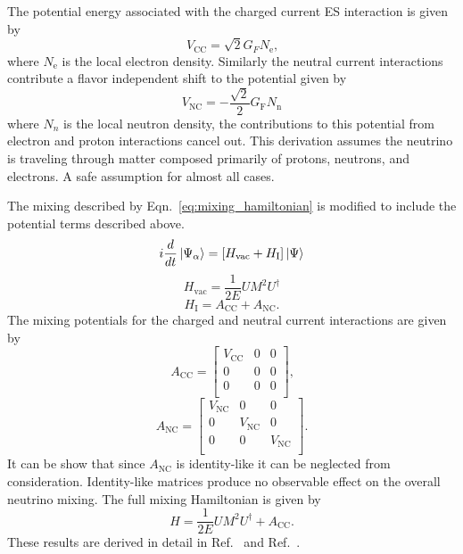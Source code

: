The potential energy associated with the charged current ES interaction
is given by
\begin{equation}
V_{\mathrm{CC}} = \sqrt{2}G_{F}N_{\text{e}}\text{,}
\end{equation}
where $N_{\mathrm{e}}$ is the local electron density.
Similarly the neutral current interactions contribute a flavor independent
shift to the potential given by
\begin{equation}
V_{\mathrm{NC}} = -\frac{\sqrt{2}}{2} G_{\text{F}} N_{\mathrm{n}}
\end{equation}
where $N_{n}$ is the local neutron density, the contributions to this potential
from electron and proton interactions cancel out.
This derivation assumes the neutrino is traveling through matter composed primarily
of protons, neutrons, and electrons.
 A safe assumption for almost all cases.

The mixing described by Eqn.~\eqref{eq:mixing_hamiltonian} is modified to include
the potential terms described above.
\begin{equation}
i\frac{d}{dt}\ket{\Psi_{\alpha}} = \left[H_{\mathrm{vac}} + H_{\mathrm{I}}\right]\ket{\Psi}
\end{equation}
\begin{equation}
H_{\mathrm{vac}}  = \frac{1}{2E}UM^{2}U^{\dagger}
\end{equation}
\begin{equation}
 H_{\mathrm{I}} =  A_{\mathrm{CC}} + A_{\mathrm{NC}}\text{.}
\end{equation}
The mixing potentials for the charged and neutral current interactions
are given by
\begin{equation}
A_{\mathrm{CC}} = 
\begin{bmatrix}
    V_{\mathrm{CC}} & 0 & 0  \\
    0 & 0 & 0  \\
    0 & 0 & 0\\
\end{bmatrix}\text{,}
\end{equation}
\begin{equation}
A_{\mathrm{NC}} = 
\begin{bmatrix}
    V_{\mathrm{NC}} & 0 & 0  \\
    0 & V_{\mathrm{NC}} & 0  \\
    0 & 0 & V_{\mathrm{NC}}\\
\end{bmatrix}\text{.}
\end{equation}
It can be show that since $A_{\mathrm{NC}}$ is identity-like it can be neglected
from consideration.
Identity-like matrices produce no observable effect on the overall neutrino mixing.
The full mixing Hamiltonian is given by
\begin{equation}
H = \frac{1}{2E}UM^{2}U^{\dagger} + A_{\mathrm{CC}}\text{.}
\end{equation}
These results are derived in detail in Ref.~\cite{wolfenstein_osc} and Ref.~\citep{giuntikim}.

